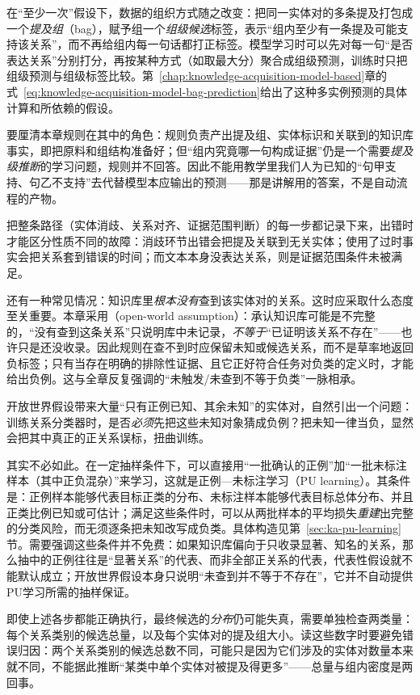 在“至少一次”假设下，数据的组织方式随之改变：把同一实体对的多条提及打包成一个\emph{提及组}（bag），赋予组一个\emph{组级候选}标签，表示“组内至少有一条提及可能支持该关系”，而不再给组内每一句话都打正标签。模型学习时可以先对每一句“是否表达关系”分别打分，再按某种方式（如取最大分）聚合成组级预测，训练时只把组级预测与组级标签比较。第~\ref{chap:knowledge-acquisition-model-based}章的式~\eqref{eq:knowledge-acquisition-model-bag-prediction}给出了这种多实例预测的具体计算和所依赖的假设。

要厘清本章规则在其中的角色：规则负责产出提及组、实体标识和关联到的知识库事实，即把原料和组结构准备好；但“组内究竟哪一句构成证据”仍是一个需要\emph{提及级推断}的学习问题，规则并不回答。因此不能用教学里我们人为已知的“句甲支持、句乙不支持”去代替模型本应输出的预测——那是讲解用的答案，不是自动流程的产物。

把整条路径（实体消歧、关系对齐、证据范围判断）的每一步都记录下来，出错时才能区分性质不同的故障：消歧环节出错会把提及关联到无关实体；使用了过时事实会把关系套到错误的时间；而文本本身没表达关系，则是证据范围条件未被满足。

还有一种常见情况：知识库里\emph{根本没有}查到该实体对的关系。这时应采取什么态度至关重要。本章采用（open-world assumption）：承认知识库可能是不完整的，“没有查到这条关系”只说明库中未记录，\emph{不等于}“已证明该关系不存在”——也许只是还没收录。因此规则在查不到时应保留未知或候选关系，而不是草率地返回负标签；只有当存在明确的排除性证据、且它正好符合任务对负类的定义时，才能给出负例。这与全章反复强调的“未触发/未查到不等于负类”一脉相承。

开放世界假设带来大量“只有正例已知、其余未知”的实体对，自然引出一个问题：训练关系分类器时，是否\emph{必须}先把这些未知对象猜成负例？把未知一律当负，显然会把其中真正的正关系误标，扭曲训练。

其实不必如此。在一定抽样条件下，可以直接用“一批确认的正例”加“一批未标注样本（其中正负混杂）”来学习，这就是正例—未标注学习（PU learning）。其条件是：正例样本能够代表目标正类的分布、未标注样本能够代表目标总体分布、并且正类比例已知或可估计；满足这些条件时，可以从两批样本的平均损失\emph{重建}出完整的分类风险，而无须逐条把未知改写成负类。具体构造见第~\ref{sec:ka-pu-learning}节。需要强调这些条件并不免费：如果知识库偏向于只收录显著、知名的关系，那么抽中的正例往往是“显著关系”的代表、而非全部正关系的代表，代表性假设就不能默认成立；开放世界假设本身只说明“未查到并不等于不存在”，它并不自动提供PU学习所需的抽样保证。

即使上述各步都能正确执行，最终候选的\emph{分布}仍可能失真，需要单独检查两类量：每个关系类别的候选总量，以及每个实体对的提及组大小。读这些数字时要避免错误归因：两个关系类别的候选总数不同，可能只是因为它们涉及的实体对数量本来就不同，不能据此推断“某类中单个实体对被提及得更多”——总量与组内密度是两回事。

